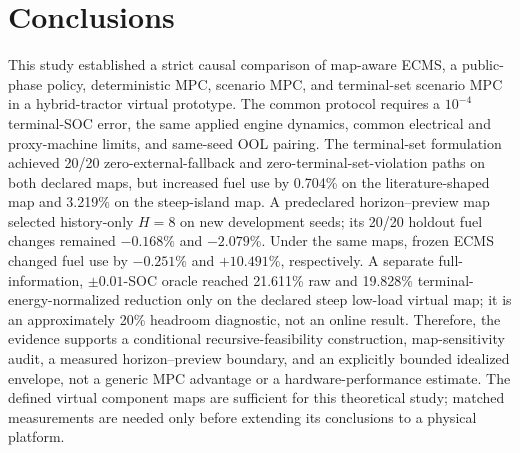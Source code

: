 \documentclass[agriengineering,article,submit,moreauthors]{Definitions/mdpi}
\begin{document}
\section{Conclusions}
This study established a strict causal comparison of map-aware ECMS, a public-phase policy, deterministic MPC, scenario MPC, and terminal-set scenario MPC in a hybrid-tractor virtual prototype. The common protocol requires a $10^{-4}$ terminal-SOC error, the same applied engine dynamics, common electrical and proxy-machine limits, and same-seed OOL pairing. The terminal-set formulation achieved 20/20 zero-external-fallback and zero-terminal-set-violation paths on both declared maps, but increased fuel use by 0.704\% on the literature-shaped map and 3.219\% on the steep-island map. A predeclared horizon--preview map selected history-only $H=8$ on new development seeds; its 20/20 holdout fuel changes remained $-0.168\%$ and $-2.079\%$. Under the same maps, frozen ECMS changed fuel use by $-0.251\%$ and $+10.491\%$, respectively. A separate full-information, $\pm0.01$-SOC oracle reached 21.611\% raw and 19.828\% terminal-energy-normalized reduction only on the declared steep low-load virtual map; it is an approximately 20\% headroom diagnostic, not an online result. Therefore, the evidence supports a conditional recursive-feasibility construction, map-sensitivity audit, a measured horizon--preview boundary, and an explicitly bounded idealized envelope, not a generic MPC advantage or a hardware-performance estimate. The defined virtual component maps are sufficient for this theoretical study; matched measurements are needed only before extending its conclusions to a physical platform.

\end{document}

